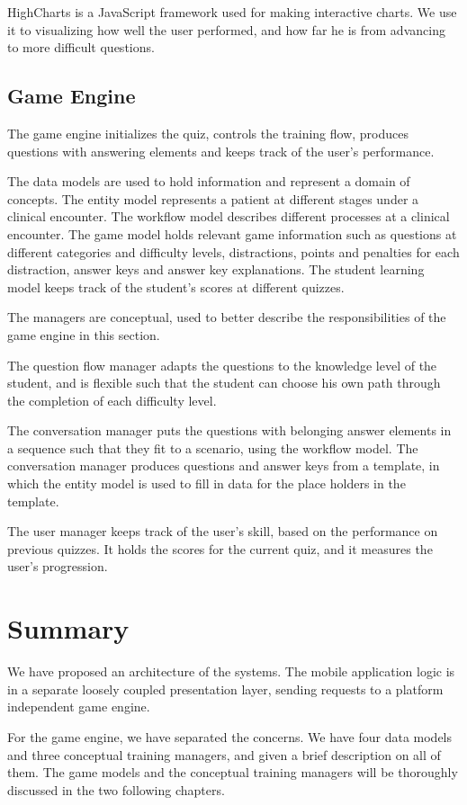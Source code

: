 HighCharts \parencite{Highsoft} is a JavaScript framework used for making interactive charts. We use it to visualizing how well the user performed, and how far he is from advancing to more difficult questions.  

\subsection{Game Engine} 
The game engine initializes the quiz, controls the training flow, produces questions with answering elements and keeps track of the user's performance. 

The data models are used to hold information and represent a domain of concepts. The entity model represents a patient at different stages under a clinical encounter. The workflow model describes different processes at a clinical encounter. The game model holds relevant game information such as questions at different categories and difficulty levels, distractions, points and penalties for each distraction, answer keys and answer key explanations. The student learning model keeps track of the student's scores at different quizzes.

The managers are conceptual, used to better describe the responsibilities of the game engine in this section. 

The question flow manager adapts the questions to the knowledge level of the student, and is flexible such that the student can choose his own path through the completion of each difficulty level. 

The conversation manager puts the questions with belonging answer elements in a sequence such that they fit to a scenario, using the workflow model. The conversation manager produces questions and answer keys from a template, in which the entity model is used to fill in data for the place holders in the template.

The user manager keeps track of the user's skill, based on the performance on previous quizzes. It holds the scores for the current quiz, and it measures the user's progression. 

\section{Summary}
We have proposed an architecture of the systems. The mobile application logic is in a separate loosely coupled presentation layer, sending requests to a platform independent game engine. 

For the game engine, we have separated the concerns. We have four data models and three conceptual training managers, and given a brief description on all of them. The game models and the conceptual training managers will be thoroughly discussed in the two following chapters.
